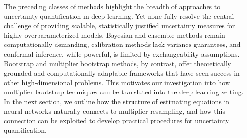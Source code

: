 \documentclass[12pt, titlepage, reqno]{article}
\begin{document}
The preceding classes of methods highlight the breadth of approaches
to uncertainty quantification in deep learning. Yet none fully resolve
the central challenge of providing scalable, statistically justified
uncertainty measures for highly overparameterized models. Bayesian and
ensemble methods remain computationally demanding, calibration methods
lack variance guarantees, and conformal inference, while powerful, is
limited by exchangeability assumptions. Bootstrap and multiplier
bootstrap methods, by contrast, offer theoretically grounded and
computationally adaptable frameworks that have seen success in other
high-dimensional problems. This motivates our investigation into how
multiplier bootstrap techniques can be translated into the deep
learning setting. In the next section, we outline how the structure of
estimating equations in neural networks naturally connects to
multiplier resampling, and how this connection can be exploited to
develop practical procedures for uncertainty quantification.






	
\end{document}
